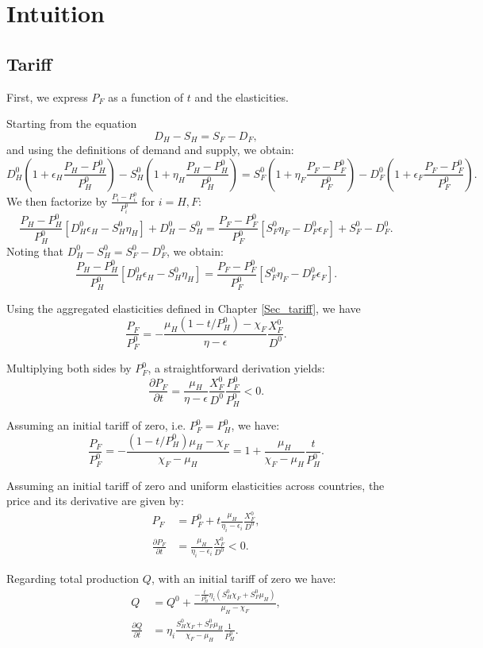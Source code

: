 \chapter{Intuition}\label{appendix:intuitions}

\section{Tariff}\label{appendix:intuitions_tariff}

First, we express $P_F$ as a function of $t$ and the elasticities.

Starting from the equation
$$
D_H - S_H = S_F - D_F,
$$
and using the definitions of demand and supply, we obtain:
$$
D_H^0\left(1+\epsilon_H \frac{P_H - P_H^0}{P_H^0}\right) - S_H^0\left(1+\eta_H \frac{P_H - P_H^0}{P_H^0}\right) = S_F^0 \left(1+\eta_F \frac{P_F - P_F^0}{P_F^0}\right) - D_F^0\left(1+\epsilon_F \frac{P_F - P_F^0}{P_F^0}\right).
$$
We then factorize by $\frac{P_i-P_i^0}{P_i^0}$ for $i = H,F$:
$$
\frac{P_H - P_H^0}{P_H^0} [D_H^0 \epsilon_H - S_H^0 \eta_H] + D_H^0 - S_H^0 = \frac{P_F - P_F^0}{P_F^0} [S_F^0 \eta_F - D_F^0 \epsilon_F] + S_F^0 - D_F^0.
$$
Noting that $D_H^0 - S_H^0 = S_F^0 - D_F^0$, we obtain:
$$
\frac{P_H - P_H^0}{P_H^0} [D_H^0 \epsilon_H - S_H^0 \eta_H] = \frac{P_F - P_F^0}{P_F^0} [S_F^0 \eta_F - D_F^0 \epsilon_F].
$$

Using the aggregated elasticities defined in Chapter \ref{Sec_tariff}, we have
$$
\frac{P_F}{P_F^0}= -\frac{\mu_H (1 - t/P_H^0) - \chi_F}{\eta-\epsilon}\frac{X_F^0}{D^0}.
$$

Multiplying both sides by $P_F^0$, a straightforward derivation yields:
$$
\frac{\partial P_F}{\partial t} = \frac{\mu_H}{\eta - \epsilon} \frac{X_F^0}{D^0} \frac{P_F^0}{P_H^0} < 0.
$$

Assuming an initial tariff of zero, i.e. $P_F^0 = P_H^0$, we have:
$$
\frac{P_F}{P_F^0} = - \frac{(1 - t/P_H^0)\mu_H - \chi_F}{\chi_F - \mu_H} = 1+\frac{\mu_H}{\chi_F - \mu_H}\frac{t}{P_H^0}.
$$

Assuming an initial tariff of zero and uniform elasticities across countries, the price and its derivative are given by:
\begin{align*}
P_F &= P_F^0 + t \frac{\mu_H}{\eta_i - \epsilon_i} \frac{X_F^0}{D^0}, \\
\frac{\partial P_F}{\partial t} &= \frac{\mu_H}{\eta_i - \epsilon_i} \frac{X_F^0}{D^0} < 0.
\end{align*}

Regarding total production $Q$, with an initial tariff of zero we have:
\begin{align*}
Q &= Q^0 + \frac{- \frac{t}{P_H^0}\eta_i(S_H^0 \chi_F + S_F^0 \mu_H)}{\mu_H - \chi_F}, \\
\frac{\partial Q}{\partial t} &= \eta_i \frac{S_H^0 \chi_F + S_F^0 \mu_H}{\chi_F - \mu_H}\frac{1}{P_H^0}.
\end{align*}

